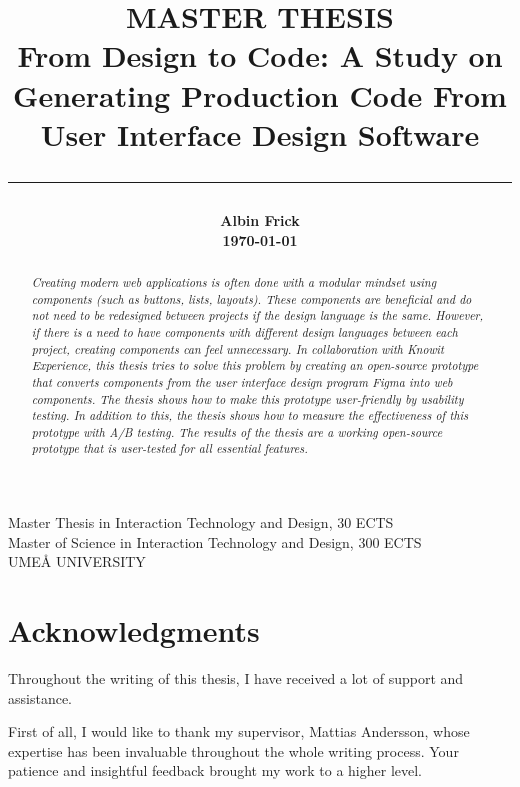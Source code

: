 \title{
    \Large MASTER THESIS\\
    \vspace{5mm}
    \huge \bf
From Design to Code: A Study on Generating Production Code From User Interface Design Software\\
        \noindent\rule{\textwidth}{0.4pt}

}

\date{} %
\author{
    \LARGE\bf{Albin Frick}\\
    \today
}

\maketitle
\vspace*{\fill}
\begin{center}
Master Thesis in Interaction Technology and Design, 30 ECTS\\
Master of Science in Interaction Technology and Design, 300 ECTS\\
UMEÅ UNIVERSITY
\end{center}
\newpage
\begin{abstract}
\textit{Creating modern web applications is often done with a modular mindset using components (such as buttons, lists, layouts). These components are beneficial and do not need to be redesigned between projects if the design language is the same. However, if there is a need to have components with different design languages between each project, creating components can feel unnecessary. In collaboration with Knowit Experience, this thesis tries to solve this problem by creating an open-source prototype that converts components from the user interface design program Figma into web components. The thesis shows how to make this prototype user-friendly by usability testing. In addition to this, the thesis shows how to measure the effectiveness of this prototype with A/B testing. The results of the thesis are a working open-source prototype that is user-tested for all essential features.}
\end{abstract}
\newpage
\tableofcontents
\newpage
\printglossary
\newpage
\section*{Acknowledgments}
Throughout the writing of this thesis, I have received a lot of support and assistance.

First of all, I would like to thank my supervisor, Mattias Andersson, whose expertise has been invaluable throughout the whole writing process. Your patience and insightful feedback brought my work to a higher level.

